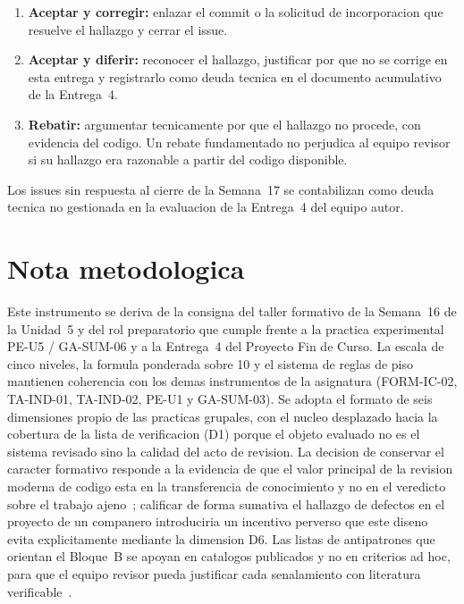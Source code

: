 \documentclass[11pt,a4paper]{article}
\begin{document}
\begin{enumerate}
    \item \textbf{Aceptar y corregir:} enlazar el commit o la solicitud de incorporacion que resuelve el hallazgo y cerrar el issue.
    \item \textbf{Aceptar y diferir:} reconocer el hallazgo, justificar por que no se corrige en esta entrega y registrarlo como deuda tecnica en el documento acumulativo de la Entrega~4.
    \item \textbf{Rebatir:} argumentar tecnicamente por que el hallazgo no procede, con evidencia del codigo. Un rebate fundamentado no perjudica al equipo revisor si su hallazgo era razonable a partir del codigo disponible.
\end{enumerate}

\noindent
Los issues sin respuesta al cierre de la Semana~17 se contabilizan como deuda tecnica no gestionada en la evaluacion de la Entrega~4 del equipo autor.

\section{Nota metodologica}

Este instrumento se deriva de la consigna del taller formativo de la Semana~16 de la Unidad~5 y del rol preparatorio que cumple frente a la practica experimental PE-U5 / GA-SUM-06 y a la Entrega~4 del Proyecto Fin de Curso.
La escala de cinco niveles, la formula ponderada sobre 10 y el sistema de reglas de piso mantienen coherencia con los demas instrumentos de la asignatura (FORM-IC-02, TA-IND-01, TA-IND-02, PE-U1 y GA-SUM-03).
Se adopta el formato de seis dimensiones propio de las practicas grupales, con el nucleo desplazado hacia la cobertura de la lista de verificacion (D1) porque el objeto evaluado no es el sistema revisado sino la calidad del acto de revision.
La decision de conservar el caracter formativo responde a la evidencia de que el valor principal de la revision moderna de codigo esta en la transferencia de conocimiento y no en el veredicto sobre el trabajo ajeno~\cite{BacchelliBird2013CodeReview,Sadowski2018ModernCodeReview}; calificar de forma sumativa el hallazgo de defectos en el proyecto de un companero introduciria un incentivo perverso que este diseno evita explicitamente mediante la dimension D6.
Las listas de antipatrones que orientan el Bloque~B se apoyan en catalogos publicados y no en criterios ad hoc, para que el equipo revisor pueda justificar cada senalamiento con literatura verificable~\cite{Cerny2023TertiaryStudy,Tighilt2023MicroserviceAntipatterns,TaibiLenarduzzi2018BadSmells}.
\end{document}
